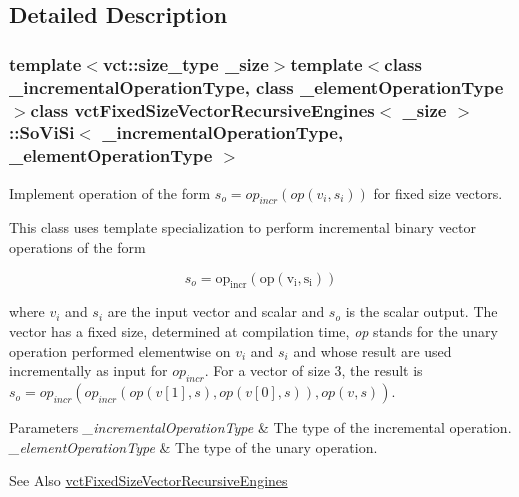\subsection{Detailed Description}
\subsubsection*{template$<$vct\-::size\-\_\-type \-\_\-size$>$template$<$class \-\_\-incremental\-Operation\-Type, class \-\_\-element\-Operation\-Type$>$class vct\-Fixed\-Size\-Vector\-Recursive\-Engines$<$ \-\_\-size $>$\-::\-So\-Vi\-Si$<$ \-\_\-incremental\-Operation\-Type, \-\_\-element\-Operation\-Type $>$}

Implement operation of the form $s_o = op_{incr}(op(v_i, s_i))$ for fixed size vectors. 

This class uses template specialization to perform incremental binary vector operations of the form

\[ s_o = \mathrm{op_{incr}(\mathrm{op}(v_i, s_i))} \]

where $v_i$ and $s_i$ are the input vector and scalar and $s_o$ is the scalar output. The vector has a fixed size, determined at compilation time, {\itshape op} stands for the unary operation performed elementwise on $v_i$ and $s_i$ and whose result are used incrementally as input for $op_{incr}$. For a vector of size 3, the result is $s_o = op_{incr}(op_{incr}(op(v[1], s), op(v[0], s)), op(v, s))$.


\begin{DoxyParams}{Parameters}
{\em \-\_\-incremental\-Operation\-Type} & The type of the incremental operation.\\
\hline
{\em \-\_\-element\-Operation\-Type} & The type of the unary operation.\\
\hline
\end{DoxyParams}
\begin{DoxySeeAlso}{See Also}
\hyperlink{classvct_fixed_size_vector_recursive_engines}{vct\-Fixed\-Size\-Vector\-Recursive\-Engines} 
\end{DoxySeeAlso}


